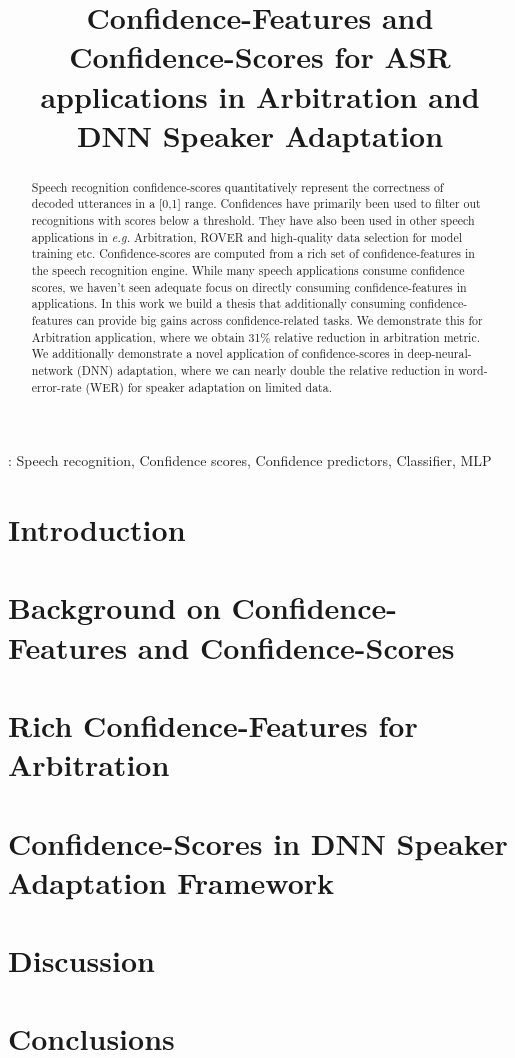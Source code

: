 \documentclass[a4paper]{article}
\title{Confidence-Features and Confidence-Scores for ASR applications in Arbitration and DNN Speaker Adaptation}
\begin{document}
\maketitle

\begin{abstract}
Speech recognition confidence-scores quantitatively represent the correctness of
decoded utterances in a [0,1] range. Confidences have primarily been used to filter out recognitions with scores below a threshold. They have also been used in other speech applications in \emph{e.g.} Arbitration, ROVER and high-quality data selection for model training etc. Confidence-scores are computed from a rich set of confidence-features in the speech recognition engine. While many speech applications consume confidence scores, we haven't seen adequate focus on directly consuming confidence-features in applications. In this work we build a thesis that additionally consuming confidence-features can provide big gains across confidence-related tasks. We demonstrate this for Arbitration application, where we obtain 31\% relative reduction in arbitration metric. We additionally demonstrate a novel application of confidence-scores in deep-neural-network (DNN) adaptation, where we can nearly double the relative reduction in word-error-rate (WER) for speaker adaptation on limited data.
\end{abstract}
: Speech recognition, Confidence scores, Confidence predictors, Classifier, MLP

%
\section{Introduction}\label{Sec:Intro}


\section{Background on Confidence-Features and Confidence-Scores}\label{Sec:CC-Background}



\section{Rich Confidence-Features for Arbitration}\label{Sec:Arbitration}


\section{Confidence-Scores in DNN Speaker Adaptation Framework}\label{Sec:Adaptation}


\section{Discussion}\label{Sec:Discussion}


\section{Conclusions}\label{Sec:Conclusion}


%


\end{document}
